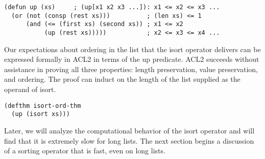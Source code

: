 \label{defun:up}
\begin{Verbatim}
(defun up (xs)     ; (up[x1 x2 x3 ...]): x1 <= x2 <= x3 ...
  (or (not (consp (rest xs)))          ; (len xs) <= 1
      (and (<= (first xs) (second xs)) ; x1 <= x2
           (up (rest xs)))))           ; x2 <= x3 <= x4 ...
\end{Verbatim}

Our expectations about ordering in the list that the \textsf{isort} operator
delivers can be expressed formally in ACL2 in terms of the \textsf{up} predicate.
ACL2 succeeds without assistance in proving
all three properties: length preservation,
value preservation, and ordering.
The proof can induct on the length
of the list supplied as the operand of \textsf{isort}.

\label{defthm:isort-ord-thm}
\begin{Verbatim}
(defthm isort-ord-thm
  (up (isort xs)))
\end{Verbatim}

Later, we will analyze the computational behavior of the \textsf{isort} operator
and will find that it is extremely slow for long lists.
The next section begins a discussion of a sorting operator
that is fast, even on long lists.

